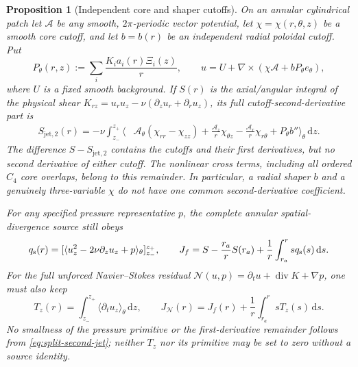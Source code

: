 \documentclass[11pt,a4paper]{article}
\theoremstyle{plain}
\newtheorem{proposition}[theorem]{Proposition}
\theoremstyle{definition}
\newcommand{\dd}{\,\mathrm{d}}
\begin{document}
\begin{proposition}[Independent core and shaper cutoffs]
\label{prop:split-cutoff}
On an annular cylindrical patch let $\mathcal A$ be any smooth,
$2\pi$-periodic vector potential, let
$\chi=\chi(r,\theta,z)$ be a smooth core cutoff, and let $b=b(r)$
be an \emph{independent} radial poloidal cutoff. Put
\[
 P_\theta(r,z):=\sum_i\frac{K_i a_i(r)\Xi_i(z)}r,\qquad
 u=U+\nabla\times\left(
          \chi\mathcal A+bP_\theta e_\theta\right),
\]
where $U$ is a fixed smooth background. If $S(r)$ is the
axial/angular integral of the physical shear
$K_{rz}=u_ru_z-\nu(\partial_z u_r+\partial_r u_z)$, its full
cutoff-\emph{second}-derivative part is
\begin{equation}\label{eq:split-second-jet}
\begin{aligned}
 S_{\mathrm{jet},2}(r)=-\nu\int_{z_-}^{z_+}
 \bigg\langle&
 \mathcal A_\theta(\chi_{rr}-\chi_{zz})
 +\frac{\mathcal A_z}{r}\chi_{\theta z}
 -\frac{\mathcal A_r}{r}\chi_{r\theta}
 +P_\theta b''\bigg\rangle_\theta\dd z .
\end{aligned}
\end{equation}
The difference $S-S_{\mathrm{jet},2}$ contains the cutoffs and
their first derivatives, but no second derivative of either
cutoff. The nonlinear cross terms, including all ordered $C_4$
core overlaps, belong to this remainder. In particular, a
radial shaper $b$ and a genuinely three-variable $\chi$ do not
have one common second-derivative coefficient.

For any specified pressure representative $p$, the complete
annular \emph{spatial-divergence} source still obeys
\[
 q_{\rm s}(r)=
 [\langle u_z^2-2\nu\partial_z u_z+p
      \rangle_\theta]_{z_-}^{z_+},\qquad
 J_f=S-\frac{r_a}{r}S(r_a)
           +\frac1r\int_{r_a}^r s q_{\rm s}(s)\dd s.
\]
For the full unforced Navier--Stokes residual
$\mathcal N(u,p)=\partial_tu+\operatorname{div}K+\nabla p$,
one must also keep
\begin{equation}\label{eq:split-temporal-flux}
 T_z(r)=\int_{z_-}^{z_+}
         \langle\partial_tu_z\rangle_\theta\dd z,
 \qquad
 J_{\mathcal N}(r)=J_f(r)
       +\frac1r\int_{r_a}^r sT_z(s)\dd s .
\end{equation}
No smallness of the pressure primitive or the first-derivative
remainder follows from \eqref{eq:split-second-jet}; neither
$T_z$ nor its primitive may be set to zero without a source
identity.
\end{proposition}
\end{document}
